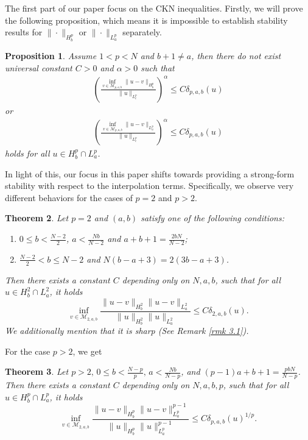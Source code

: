 \documentclass[11pt]{article}
\newtheorem{theorem}{Theorem}[section]
\newtheorem{proposition}[theorem]{Proposition}
\numberwithin{equation}{section}
\begin{document}
The first part of our paper focus on the CKN inequalities.  Firstly, we will prove the following proposition, which means it is impossible to establish stability results for $\|\cdot\|_{H_b^p}$ or $\|\cdot\|_{L_a^p}$ separately.
\begin{proposition}\label{prop1}
    Assume $1<p<N$ and $b+1\neq a$, then there do not exist universal constant $C>0$ and $\alpha > 0$ such that
    \begin{align*}
        \left( \frac{\inf_{v\in \mathcal{M}_{p,a,b}}\|u-v\|_{H^p_b} }{\|u\|_{L^p_c}} \right)^\alpha \le C \delta_{p,a,b}(u)
    \end{align*}
    or
    \begin{align*}
        \left( \frac{\inf_{v\in \mathcal{M}_{p,a,b}}\|u-v\|_{L^p_a} }{\|u\|_{L^p_c}} \right)^\alpha \le C \delta_{p,a,b}(u)
    \end{align*}
    holds for all $u \in H^p_b \cap L^p_a$.
\end{proposition}
In light of this, our focus in this paper shifts towards providing a strong-form stability with respect to the interpolation terms. Specifically, we observe  very different
behaviors for the cases of  $p=2$ and $p>2.$
\begin{theorem}\label{main p=2}
    Let  $p=2$ and  $(a,b)$ satisfy one of the following conditions:
    \begin{enumerate}
        \item [(1)] $0\le b < \frac{N-2}{2}$, $a<\frac{Nb}{N-2}$ and $a+b+1=\frac{2bN}{N-2}$;
        \item [(2)] $\frac{N-2}{2}<b\le N-2$ and $N(b-a+3) = 2(3b-a+3)$.
    \end{enumerate}
    Then there exists a constant $C$ depending only on $N,a,b$, such that for all $u\in H_b^2\cap L^2_a$, it holds
    \begin{equation}\label{result}
        \inf_{v\in\mathcal{M}_{2,a,b}}\frac{ \|u-v\|_{H_b^2} \|u-v\|_{L^2_a} }{\|u\|_{H_b^2}\|u\|_{L^2_a}} \le C\delta_{2,a,b}(u).
    \end{equation}
    We additionally mention that it is sharp (See Remark \ref{rmk 3.1}).
\end{theorem}
For the case $p>2$, we get
\begin{theorem}\label{main}
    Let $p>2,\, 0\le b <\frac{N-p}{p},\, a<\frac{Nb}{N-p}$, and $(p-1)a+b+1=\frac{pbN}{N-p}$. Then there exists a constant $C$ depending only on $N,a,b,p$, such that for all $u\in H_b^p\cap L_a^p$, it holds
    \begin{equation}\label{general result}
        \inf_{v\in\mathcal{M}_{2,a,b}}\frac{ \|u-v\|_{H_b^p} \|u-v\|_{L^p_a}^{p-1} }{\|u\|_{H^p_b}\|u\|_{L^p_a}^{p-1}} \le C\delta_{p,a,b}(u)^{1/p}.
    \end{equation}
\end{theorem}
\end{document}
